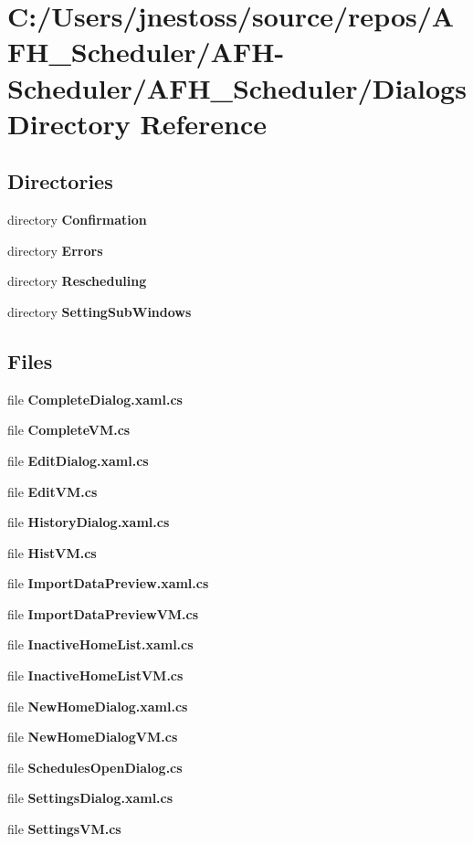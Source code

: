 \section{C\+:/\+Users/jnestoss/source/repos/\+A\+F\+H\+\_\+\+Scheduler/\+A\+F\+H-\/\+Scheduler/\+A\+F\+H\+\_\+\+Scheduler/\+Dialogs Directory Reference}
\label{dir_acb890ae8fea8b54f79ec5d452549cae}
\subsection*{Directories}
\begin{DoxyCompactItemize}
\item 
directory \textbf{ Confirmation}
\item 
directory \textbf{ Errors}
\item 
directory \textbf{ Rescheduling}
\item 
directory \textbf{ Setting\+Sub\+Windows}
\end{DoxyCompactItemize}
\subsection*{Files}
\begin{DoxyCompactItemize}
\item 
file \textbf{ Complete\+Dialog.\+xaml.\+cs}
\item 
file \textbf{ Complete\+V\+M.\+cs}
\item 
file \textbf{ Edit\+Dialog.\+xaml.\+cs}
\item 
file \textbf{ Edit\+V\+M.\+cs}
\item 
file \textbf{ History\+Dialog.\+xaml.\+cs}
\item 
file \textbf{ Hist\+V\+M.\+cs}
\item 
file \textbf{ Import\+Data\+Preview.\+xaml.\+cs}
\item 
file \textbf{ Import\+Data\+Preview\+V\+M.\+cs}
\item 
file \textbf{ Inactive\+Home\+List.\+xaml.\+cs}
\item 
file \textbf{ Inactive\+Home\+List\+V\+M.\+cs}
\item 
file \textbf{ New\+Home\+Dialog.\+xaml.\+cs}
\item 
file \textbf{ New\+Home\+Dialog\+V\+M.\+cs}
\item 
file \textbf{ Schedules\+Open\+Dialog.\+cs}
\item 
file \textbf{ Settings\+Dialog.\+xaml.\+cs}
\item 
file \textbf{ Settings\+V\+M.\+cs}
\end{DoxyCompactItemize}
